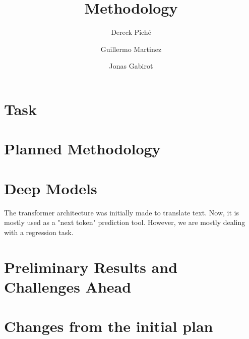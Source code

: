 \documentclass{article}
\title{Methodology}
\author
{
    Dereck Piché \and
    Guillermo Martinez \and
    Jonas Gabirot \and
}
\begin{document}
\maketitle

\section{Task}


\section{Planned Methodology}
\section{Deep Models}
The transformer architecture was initially made to translate text.
Now, it is mostly used as a "next token" prediction tool. 
However, we are mostly dealing with a regression task. 

\section{Preliminary Results and Challenges Ahead}

\section{Changes from the initial plan}
\end{document}
